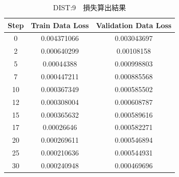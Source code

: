 \documentclass{jreport}		%
\begin{document}
\begin{table}
  \begin{center}
  \caption{DIST:9　損失算出結果}
  \begin{tabular}{c|cc} \hline
Step&Train Data Loss&Validation Data Loss \\ \hline
0&0.004371066&0.003043697 \\
2&0.000640299&0.00108158 \\
5&0.00044388&0.000998803 \\
7&0.000447211&0.000885568 \\
10&0.000367349&0.000585502 \\
12&0.000308004&0.000608787 \\
15&0.000365632&0.000589616 \\
17&0.00026646&0.000582271 \\
20&0.000269611&0.000546894 \\
25&0.000210636&0.000544931 \\
30&0.000240948&0.000469696 \\

\end{tabular}
\end{center}
\end{table}
\end{document}
